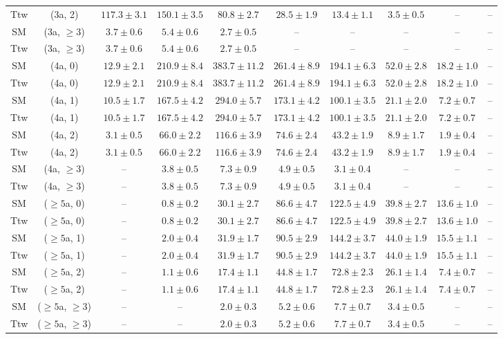 \begin{table}[h!]
{\begin{tabular}{cccccccccc}
	Ttw & (3a, 2) & $117.3\pm 3.1$ & $150.1\pm 3.5$ & $80.8\pm 2.7$ & $28.5\pm 1.9$ & $13.4\pm 1.1$ & $3.5\pm 0.5$ & -- & -- \\[0.5ex] 
	SM & (3a, $\ge3$) & $3.7\pm 0.6$ & $5.4\pm 0.6$ & $2.7\pm 0.5$ & -- & -- & -- & -- & -- \\[0.5ex] 
	Ttw & (3a, $\ge3$) & $3.7\pm 0.6$ & $5.4\pm 0.6$ & $2.7\pm 0.5$ & -- & -- & -- & -- & -- \\[0.5ex] 
	SM & (4a, 0) & $12.9\pm 2.1$ & $210.9\pm 8.4$ & $383.7\pm 11.2$ & $261.4\pm 8.9$ & $194.1\pm 6.3$ & $52.0\pm 2.8$ & $18.2\pm 1.0$ & -- \\[0.5ex] 
	Ttw & (4a, 0) & $12.9\pm 2.1$ & $210.9\pm 8.4$ & $383.7\pm 11.2$ & $261.4\pm 8.9$ & $194.1\pm 6.3$ & $52.0\pm 2.8$ & $18.2\pm 1.0$ & -- \\[0.5ex] 
	SM & (4a, 1) & $10.5\pm 1.7$ & $167.5\pm 4.2$ & $294.0\pm 5.7$ & $173.1\pm 4.2$ & $100.1\pm 3.5$ & $21.1\pm 2.0$ & $7.2\pm 0.7$ & -- \\[0.5ex] 
	Ttw & (4a, 1) & $10.5\pm 1.7$ & $167.5\pm 4.2$ & $294.0\pm 5.7$ & $173.1\pm 4.2$ & $100.1\pm 3.5$ & $21.1\pm 2.0$ & $7.2\pm 0.7$ & -- \\[0.5ex] 
	SM & (4a, 2) & $3.1\pm 0.5$ & $66.0\pm 2.2$ & $116.6\pm 3.9$ & $74.6\pm 2.4$ & $43.2\pm 1.9$ & $8.9\pm 1.7$ & $1.9\pm 0.4$ & -- \\[0.5ex] 
	Ttw & (4a, 2) & $3.1\pm 0.5$ & $66.0\pm 2.2$ & $116.6\pm 3.9$ & $74.6\pm 2.4$ & $43.2\pm 1.9$ & $8.9\pm 1.7$ & $1.9\pm 0.4$ & -- \\[0.5ex] 
	SM & (4a, $\ge3$) & -- & $3.8\pm 0.5$ & $7.3\pm 0.9$ & $4.9\pm 0.5$ & $3.1\pm 0.4$ & -- & -- & -- \\[0.5ex] 
	Ttw & (4a, $\ge3$) & -- & $3.8\pm 0.5$ & $7.3\pm 0.9$ & $4.9\pm 0.5$ & $3.1\pm 0.4$ & -- & -- & -- \\[0.5ex] 
	SM & ($\ge5$a, 0) & -- & $0.8\pm 0.2$ & $30.1\pm 2.7$ & $86.6\pm 4.7$ & $122.5\pm 4.9$ & $39.8\pm 2.7$ & $13.6\pm 1.0$ & -- \\[0.5ex] 
	Ttw & ($\ge5$a, 0) & -- & $0.8\pm 0.2$ & $30.1\pm 2.7$ & $86.6\pm 4.7$ & $122.5\pm 4.9$ & $39.8\pm 2.7$ & $13.6\pm 1.0$ & -- \\[0.5ex] 
	SM & ($\ge5$a, 1) & -- & $2.0\pm 0.4$ & $31.9\pm 1.7$ & $90.5\pm 2.9$ & $144.2\pm 3.7$ & $44.0\pm 1.9$ & $15.5\pm 1.1$ & -- \\[0.5ex] 
	Ttw & ($\ge5$a, 1) & -- & $2.0\pm 0.4$ & $31.9\pm 1.7$ & $90.5\pm 2.9$ & $144.2\pm 3.7$ & $44.0\pm 1.9$ & $15.5\pm 1.1$ & -- \\[0.5ex] 
	SM & ($\ge5$a, 2) & -- & $1.1\pm 0.6$ & $17.4\pm 1.1$ & $44.8\pm 1.7$ & $72.8\pm 2.3$ & $26.1\pm 1.4$ & $7.4\pm 0.7$ & -- \\[0.5ex] 
	Ttw & ($\ge5$a, 2) & -- & $1.1\pm 0.6$ & $17.4\pm 1.1$ & $44.8\pm 1.7$ & $72.8\pm 2.3$ & $26.1\pm 1.4$ & $7.4\pm 0.7$ & -- \\[0.5ex] 
	SM & ($\ge5$a, $\ge3$) & -- & -- & $2.0\pm 0.3$ & $5.2\pm 0.6$ & $7.7\pm 0.7$ & $3.4\pm 0.5$ & -- & -- \\[0.5ex] 
	Ttw & ($\ge5$a, $\ge3$) & -- & -- & $2.0\pm 0.3$ & $5.2\pm 0.6$ & $7.7\pm 0.7$ & $3.4\pm 0.5$ & -- & -- \\[0.5ex] 
	\hline
	\hline
\end{tabular}}
\end{table}
